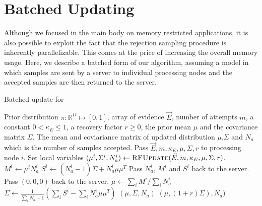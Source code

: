 \documentclass[twoside]{article}
\newcommand{\CRej}{\text{rejection filtering}}
\begin{document}
\section{Batched Updating}
\label{app:batched-updates}

Although we focused in the main body on memory restricted applications, it is also possible to exploit the fact that the
rejection sampling procedure is inherently parallelizable.
This comes at the price of increasing the overall
memory usage. Here, we describe a batched form of our algorithm, assuming a model in which samples are sent by a server to individual processing nodes and the accepted samples are then returned to the server.

\begin{algorithm}
    \caption{Batched update for \CRej}
    \label{alg:batchcrej}
    \begin{algorithmic}
        \Require Prior distribution $\pi:\mathbb{R}^D \mapsto [0,1]$, array of evidence $\vec{E}$, number of attempts $m$, a constant $0<\kappa_E\le 1$, a recovery factor $r \ge 0$, the prior mean $\mu$ and the covariance matrix $\Sigma$.
        \Ensure  The mean and coviariance matrix of updated distribution $\mu$,$\Sigma$ and $N_a$ which is the number of samples accepted.
  \State Pass $\vec{E},m,\kappa_E, \mu,\Sigma,r$ to processing node $i$.
  \State Set local variables $(\mu^{i}, \Sigma^{i},N_a^{i})\gets \Call{RFUpdate}{\vec{E},m,\kappa_E,\mu,\Sigma,r}$.
  \State $M^i \gets \mu^i N_a^i$
  \State $S^i \gets (N_a^i-1)\Sigma +N_a^i\mu\mu^T$ 
  \State Pass $N_a^i$, $M^i$ and $S^i$ back to the server.       
  \Else \State Pass $(0,0,0)$ back to the server.
  \EndIf
  \EndFor
     \State $\mu\gets \sum_i M^{i}/\sum_i N_a^i $
     \State $\Sigma \gets \frac{1}{\sum_i N_a^i -1}\left(\sum_i S^i - \sum_i N_a^i \mu\mu^T \right)$
  \State\Return $(\mu,\Sigma,N_a)$
   \Else
  \State\Return $(\mu, (1+r)\Sigma),N_a)$

   \EndIf
          
        \EndFunction
    \end{algorithmic}
\end{algorithm}
\end{document}
